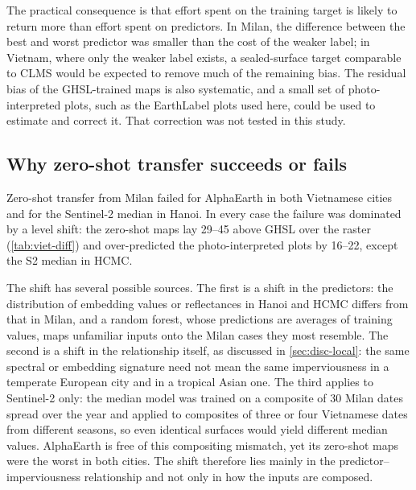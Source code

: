 The practical consequence is that effort spent on the training target is
likely to return more than effort spent on predictors. In Milan, the
difference between the best and worst predictor was smaller than the cost
of the weaker label; in Vietnam, where only the weaker label exists, a
sealed-surface target comparable to CLMS would be expected to remove much
of the remaining bias. The residual bias of the GHSL-trained maps is also
systematic, and a small set of photo-interpreted plots, such as the
EarthLabel plots used here, could be used to estimate and correct it. That
correction was not tested in this study.

\subsection{Why zero-shot transfer succeeds or fails}
\label{sec:disc-zeroshot}

Zero-shot transfer from Milan failed for AlphaEarth in both Vietnamese
cities and for the Sentinel-2 median in Hanoi. In every case the failure
was dominated by a level shift: the zero-shot maps lay 29--45\pp{} above
GHSL over the raster (\cref{tab:viet-diff}) and over-predicted the
photo-interpreted plots by 16--22\pp{}, except the S2 median in HCMC.

The shift has several possible sources. The first is a shift in the
predictors: the distribution of embedding values or reflectances in Hanoi
and HCMC differs from that in Milan, and a random forest, whose predictions
are averages of training values, maps unfamiliar inputs onto the Milan
cases they most resemble. The second is a shift in the relationship
itself, as discussed in \cref{sec:disc-local}: the same spectral or
embedding signature need not mean the same imperviousness in a temperate
European city and in a tropical Asian one. The third applies to Sentinel-2
only: the median model was trained on a composite of 30 Milan dates spread
over the year and applied to composites of three or four Vietnamese dates
from different seasons, so even identical surfaces would yield different
median values. AlphaEarth is free of this compositing mismatch, yet its
zero-shot maps were the worst in both cities. The shift therefore lies
mainly in the predictor--imperviousness relationship and not only in how
the inputs are composed.

